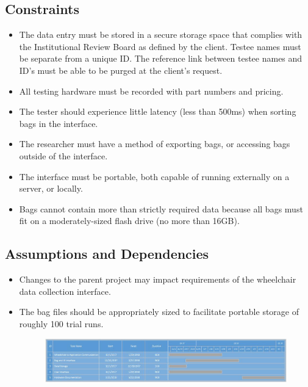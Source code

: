 \documentclass[onecolumn, draftclsnofoot,10pt, compsoc]{IEEEtran}
\begin{document}
\subsection{Constraints}
\begin{itemize}
	\item The data entry must be stored in a secure storage space that complies with the Institutional Review Board as defined by the client.
		\subitem Testee names must be separate from a unique ID.
		\subitem The reference link between testee names and ID's must be able to be purged at the client's request.
	\item All testing hardware must be recorded with part numbers and pricing.
	\item The tester should experience little latency (less than 500ms) when sorting bags in the interface.
	\item The researcher must have a method of exporting bags, or accessing bags outside of the interface.
	\item The interface must be portable, both capable of running externally on a server, or locally.
	\item Bags cannot contain more than strictly required data because all bags must fit on a moderately-sized flash drive (no more than 16GB).
\end{itemize}
\subsection{Assumptions and Dependencies}
\begin{itemize}
	\item Changes to the parent project may impact requirements of the wheelchair data collection interface.
	\item The bag files should be appropriately sized to facilitate portable storage of roughly 100 trial runs.
	
	\begin{figure}[h!]
		\centering
		\includegraphics[width=\linewidth, scale=0.7]{PrelimGanttChart.jpg}
	\end{figure}
	
\end{itemize}
\end{document}
